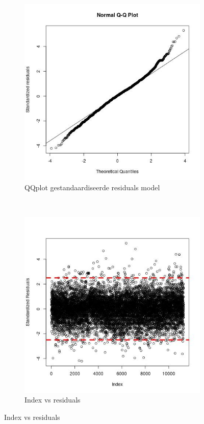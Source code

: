 \documentclass[a4paper,kulak]{kulakarticle} %
\begin{document}
\begin{figure}[H]
	\centering
	\begin{subfigure}[b]{0.3\textwidth}
		\includegraphics[width=\textwidth]{qqnes.jpg}
		\caption{QQplot gestandaardiseerde residuals model}
		\label{fig:qqnes}
	\end{subfigure}
	~
	\begin{subfigure}[b]{0.3\textwidth}
		\includegraphics[width=\textwidth]{stdnes.jpg}
		\caption{Index vs residuals}
		\label{fig:stdnes}
	\end{subfigure}
\end{figure}
\end{document}
